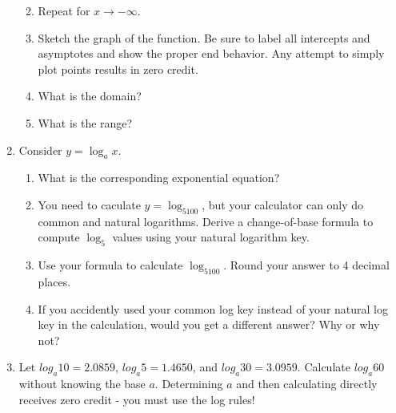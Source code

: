 \documentclass[letterpaper,12pt,fleqn]{article}
\begin{document}
\begin{enumerate}
\begin{enumerate}
\vspace{1.0in}

\item Repeat for $x\to-\infty$.

\newpage

\item Sketch the graph of the function.  Be sure to label all intercepts and
asymptotes and show the proper end behavior.  Any attempt to simply plot points
results in zero credit.

\vspace{4in}

\item What is the domain?

\vspace{1in}

\item What is the range?
\end{enumerate}

\newpage

\item Consider $y=\log_ax$.
\begin{enumerate}
\item What is the corresponding exponential equation?

\vspace{1in}

\item You need to caculate $y=\log_5100$, but your calculator can only do
common and natural logarithms.  Derive a change-of-base formula to compute
$\log_5$ values using your natural logarithm key.

\vspace{3in}

\item Use your formula to calculate $\log_5100$.  Round your answer to 4
decimal places.

\vspace{2in}

\item If you accidently used your common log key instead of your natural log
key in the calculation, would you get a different answer?  Why or why not?
\end{enumerate}

\newpage

\item Let $log_a10=2.0859$, $log_a5=1.4650$, and $log_a30=3.0959$.  Calculate
$log_a60$ without knowing the base $a$.  Determining $a$ and then calculating
directly receives zero credit - you must use the log rules!


\end{enumerate}
\end{document}
